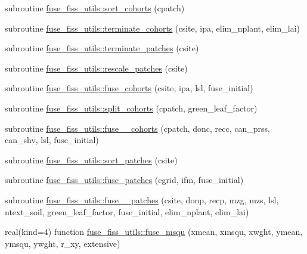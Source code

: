 \begin{DoxyCompactItemize}
\item 
subroutine \hyperlink{namespacefuse__fiss__utils_a31e4835d2465d1400c7cbbb51976b341}{fuse\+\_\+fiss\+\_\+utils\+::sort\+\_\+cohorts} (cpatch)
\item 
subroutine \hyperlink{namespacefuse__fiss__utils_a5dc8f0ad95ff159ac69570ac55856524}{fuse\+\_\+fiss\+\_\+utils\+::terminate\+\_\+cohorts} (csite, ipa, elim\+\_\+nplant, elim\+\_\+lai)
\item 
subroutine \hyperlink{namespacefuse__fiss__utils_a480df748f946b24daa940c15d72abfe2}{fuse\+\_\+fiss\+\_\+utils\+::terminate\+\_\+patches} (csite)
\item 
subroutine \hyperlink{namespacefuse__fiss__utils_ab3b0eeed8a63cc2f4b866ac243e25ec6}{fuse\+\_\+fiss\+\_\+utils\+::rescale\+\_\+patches} (csite)
\item 
subroutine \hyperlink{namespacefuse__fiss__utils_ad53341751380c44b17d1e7ec0a5ae824}{fuse\+\_\+fiss\+\_\+utils\+::fuse\+\_\+cohorts} (csite, ipa, lsl, fuse\+\_\+initial)
\item 
subroutine \hyperlink{namespacefuse__fiss__utils_aba30221565235a7c9cdeadb079d324c5}{fuse\+\_\+fiss\+\_\+utils\+::split\+\_\+cohorts} (cpatch, green\+\_\+leaf\+\_\+factor)
\item 
subroutine \hyperlink{namespacefuse__fiss__utils_a2fc600375d38f7ddcf60ebf5da725971}{fuse\+\_\+fiss\+\_\+utils\+::fuse\+\_\+\_\+cohorts} (cpatch, donc, recc, can\+\_\+prss, can\+\_\+shv, lsl, fuse\+\_\+initial)
\item 
subroutine \hyperlink{namespacefuse__fiss__utils_a546d7beff2f991a07c8fbba91921ce5f}{fuse\+\_\+fiss\+\_\+utils\+::sort\+\_\+patches} (csite)
\item 
subroutine \hyperlink{namespacefuse__fiss__utils_aee30640ff825246fb4c9f5f1f41470be}{fuse\+\_\+fiss\+\_\+utils\+::fuse\+\_\+patches} (cgrid, ifm, fuse\+\_\+initial)
\item 
subroutine \hyperlink{namespacefuse__fiss__utils_ad3a8f1f374137c79a74aed4b42bca8a9}{fuse\+\_\+fiss\+\_\+utils\+::fuse\+\_\+\_\+patches} (csite, donp, recp, mzg, mzs, lsl, ntext\+\_\+soil, green\+\_\+leaf\+\_\+factor, fuse\+\_\+initial, elim\+\_\+nplant, elim\+\_\+lai)
\item 
real(kind=4) function \hyperlink{namespacefuse__fiss__utils_aae52213c98fe3ffb3ecde24d8ffc6e03}{fuse\+\_\+fiss\+\_\+utils\+::fuse\+\_\+msqu} (xmean, xmsqu, xwght, ymean, ymsqu, ywght, r\+\_\+xy, extensive)
\end{DoxyCompactItemize}
